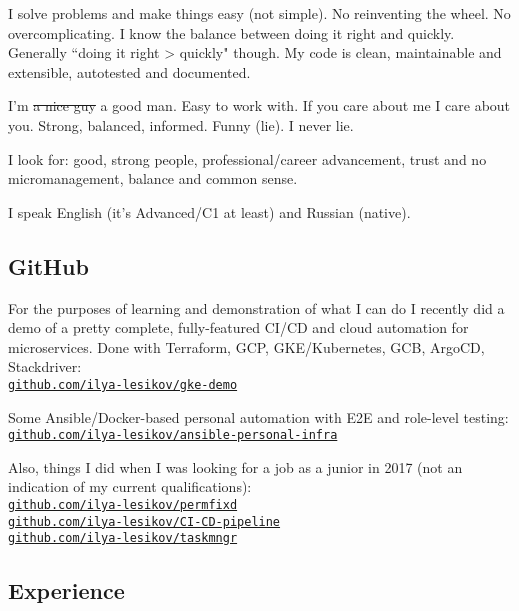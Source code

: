\documentclass[11pt, a4paper]{article}
\newcommand{\Delimitline}{
  \vspace{-2ex}
  \noindent\makebox[\linewidth]{\rule{\DelimitlineLength}{0.12ex}} }
\newcommand\rurl[1]{%
  \-\hspace{0.5em}
  \href{http://#1}{\nolinkurl{#1}}%
}
\newcommand{\forceindent}{\leavevmode{\parindent=1em\indent}}
\begin{document}
\forceindent I solve problems and make things easy (not simple). No reinventing the wheel. No overcomplicating. I know the balance between doing it right and quickly. Generally ``doing it right > quickly" though. My code is clean, maintainable and extensible, autotested and documented.

\forceindent I'm \sout{a nice guy} a good man. Easy to work with. If you care about me I care about you. Strong, balanced, informed. Funny (lie). I never lie.

\forceindent I look for: good, strong people, professional/career advancement, trust and no micromanagement, balance and common sense.

\forceindent I speak English (it's Advanced/C1 at least) and Russian (native).


\subsection*{GitHub}
\Delimitline

\forceindent For the purposes of learning and demonstration of what I can do I recently did a demo of a pretty complete, fully-featured CI/CD and cloud automation for microservices. Done with Terraform, GCP, GKE/Kubernetes, GCB, ArgoCD, Stackdriver:\vspace{0.2em}\\
\rurl{github.com/ilya-lesikov/gke-demo}

Some Ansible/Docker-based personal automation with E2E and role-level testing:\vspace{0.2em}\\
\rurl{github.com/ilya-lesikov/ansible-personal-infra}

Also, things I did when I was looking for a job as a junior in 2017 (not an indication of my current qualifications):\vspace{0.2em}\\
\rurl{github.com/ilya-lesikov/permfixd}\\
\rurl{github.com/ilya-lesikov/CI-CD-pipeline}\\
\rurl{github.com/ilya-lesikov/taskmngr}


\subsection*{Experience}
\Delimitline
\end{document}

